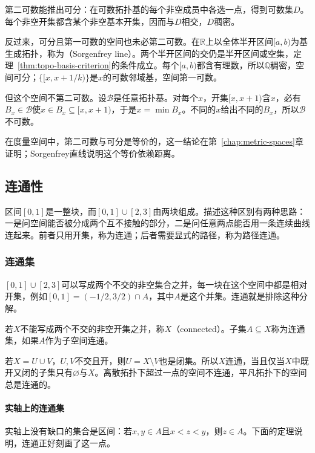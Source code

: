第二可数能推出可分：在可数拓扑基的每个非空成员中各选一点，得到可数集$D$。每个非空开集都含某个非空基本开集，因而与$D$相交，$D$稠密。

反过来，可分且第一可数的空间也未必第二可数。在$\mathbb R$上以全体半开区间$[a,b)$为基生成拓扑，称为（Sorgenfrey line）。两个半开区间的交仍是半开区间或空集，定理~\ref{thm:topo-basis-criterion}的条件成立。每个$[a,b)$都含有理数，所以$\mathbb Q$稠密，空间可分；$\{[x,x+1/k)\}$是$x$的可数邻域基，空间第一可数。

但这个空间不第二可数。设$\mathcal B$是任意拓扑基。对每个$x$，开集$[x,x+1)$含$x$，必有$B_x\in\mathcal B$使$x\in B_x\subseteq[x,x+1)$，于是$x=\min B_x$。不同的$x$给出不同的$B_x$，所以$\mathcal B$不可数。

在度量空间中，第二可数与可分是等价的，这一结论在第~\ref{chap:metric-spaces}章证明；Sorgenfrey直线说明这个等价依赖距离。

\subsection{连通性}
\label{sec:topo-connectedness}

区间$[0,1]$是一整块，而$[0,1]\cup[2,3]$由两块组成。描述这种区别有两种思路：一是问空间能否被分成两个互不接触的部分，二是问任意两点能否用一条连续曲线连起来。前者只用开集，称为连通；后者需要显式的路径，称为路径连通。

\subsubsection{连通集}
\label{sec:topo-connected-sets}

$[0,1]\cup[2,3]$可以写成两个不交的非空集合之并，每一块在这个空间中都是相对开集，例如$[0,1]=(-1/2,3/2)\cap A$，其中$A$是这个并集。连通就是排除这种分解。

\begin{definition}[连通空间]
\label{def:topo-connected}
若$X$不能写成两个不交的非空开集之并，称$X$（connected）。子集$A\subseteq X$称为连通集，如果$A$作为子空间连通。
\end{definition}

若$X=U\cup V$，$U,V$不交且开，则$U=X\setminus V$也是闭集。所以$X$连通，当且仅当$X$中既开又闭的子集只有$\varnothing$与$X$。离散拓扑下超过一点的空间不连通，平凡拓扑下的空间总是连通的。

\paragraph{实轴上的连通集}
实轴上没有缺口的集合是区间：若$x,y\in A$且$x<z<y$，则$z\in A$。下面的定理说明，连通正好刻画了这一点。

